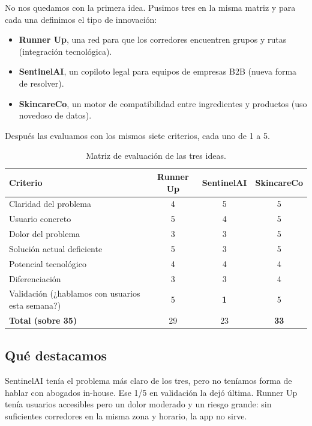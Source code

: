 \documentclass[11pt,a4paper]{article}
\begin{document}
No nos quedamos con la primera idea. Pusimos tres en la misma matriz y para cada una definimos el tipo de innovación:

\begin{itemize}
  \item \textbf{Runner Up}, una red para que los corredores encuentren grupos y rutas (integración tecnológica).
  \item \textbf{SentinelAI}, un copiloto legal para equipos de empresas B2B (nueva forma de resolver).
  \item \textbf{SkincareCo}, un motor de compatibilidad entre ingredientes y productos (uso novedoso de datos).
\end{itemize}

Después las evaluamos con los mismos siete criterios, cada uno de 1 a 5.

\begin{table}[h]
\centering
\small
\begin{tabular}{@{}lccc@{}}
\toprule
\textbf{Criterio} & \textbf{Runner Up} & \textbf{SentinelAI} & \textbf{SkincareCo} \\
\midrule
Claridad del problema & 4 & 5 & 5 \\
Usuario concreto & 5 & 4 & 5 \\
Dolor del problema & 3 & 3 & 5 \\
Solución actual deficiente & 5 & 3 & 5 \\
Potencial tecnológico & 4 & 4 & 4 \\
Diferenciación & 3 & 3 & 4 \\
Validación (¿hablamos con usuarios esta semana?) & 5 & \textbf{1} & 5 \\
\midrule
\textbf{Total (sobre 35)} & 29 & 23 & \textbf{33} \\
\bottomrule
\end{tabular}
\caption{Matriz de evaluación de las tres ideas.}
\end{table}

\subsection{Qué destacamos}

SentinelAI tenía el problema más claro de los tres, pero no teníamos forma de hablar con abogados in-house. Ese 1/5 en validación la dejó última. Runner Up tenía usuarios accesibles pero un dolor moderado y un riesgo grande: sin suficientes corredores en la misma zona y horario, la app no sirve.
\end{document}
